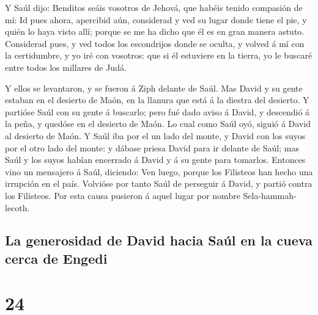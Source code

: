  Y Saúl dijo: Benditos seáis vosotros de Jehová, que habéis
tenido compasión de mí:  Id pues ahora, apercibid aún,
considerad y ved su lugar donde tiene el pie, y quién lo haya visto
allí; porque se me ha dicho que él es en gran manera astuto.
 Considerad pues, y ved todos los escondrijos donde se
oculta, y volved á mí con la certidumbre, y yo iré con vosotros: que si
él estuviere en la tierra, yo le buscaré entre todos los millares de
Judá.

 Y ellos se levantaron, y se fueron á Ziph delante de Saúl.
Mas David y su gente estaban en el desierto de Maón, en la llanura que
está á la diestra del desierto.  Y partióse Saúl con su
gente á buscarlo; pero fué dado aviso á David, y descendió á la peña, y
quedóse en el desierto de Maón. Lo cual como Saúl oyó, siguió á David al
desierto de Maón.  Y Saúl iba por el un lado del monte, y
David con los suyos por el otro lado del monte: y dábase priesa David
para ir delante de Saúl; mas Saúl y los suyos habían encerrado á David y
á su gente para tomarlos.  Entonces vino un mensajero á
Saúl, diciendo: Ven luego, porque los Filisteos han hecho una irrupción
en el país.  Volvióse por tanto Saúl de perseguir á David,
y partió contra los Filisteos. Por esta causa pusieron á aquel lugar por
nombre Sela-hammah-lecoth.

\hypertarget{la-generosidad-de-david-hacia-sauxfal-en-la-cueva-cerca-de-engedi}{%
\subsection{La generosidad de David hacia Saúl en la cueva cerca de
Engedi}\label{la-generosidad-de-david-hacia-sauxfal-en-la-cueva-cerca-de-engedi}}

\hypertarget{section-23}{%
\section{24}\label{section-23}}

